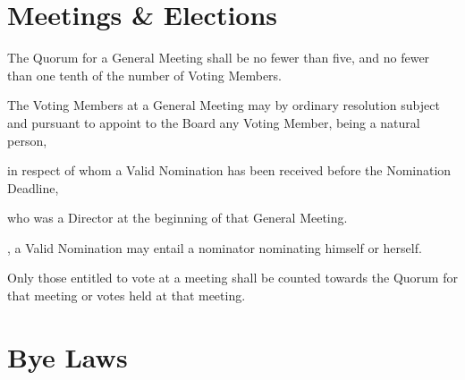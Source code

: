 \documentclass[10pt]{mk-articles-of-association}
\newcommand{\EC}[0]{Board}
\newcommand{\Exec}[0]{\EC{} }
\begin{document}


\section{Meetings \& Elections}

\begin{constenum}

  \item The Quorum for a General Meeting shall be no fewer than five, and
    no fewer than one tenth of the number of Voting Members.\label{quorum}

  \item The Voting Members at a General Meeting may by ordinary
    resolution subject and pursuant to 
    appoint to the \Exec any Voting Member, being a natural person,
    \begin{constenum}
      \item in respect of whom a Valid Nomination has been received
        before the Nomination Deadline, \ITor
      \item who was a Director at the beginning of that General Meeting.
    \end{constenum}

  \item \avoiddoubt, a Valid Nomination may entail a nominator nominating
    himself or herself.

  \item Only those entitled to vote at a meeting shall be counted towards
    the Quorum for that meeting or votes held at that meeting.

\end{constenum}



\section{Bye Laws}
\end{document}
